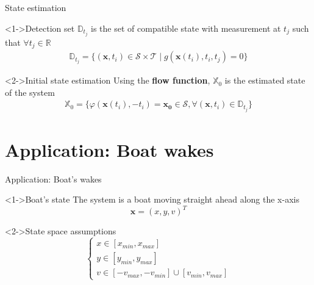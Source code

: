 \documentclass{beamer}
\begin{document}
            \begin{frame}{State estimation}
                \begin{block}<1->{Detection set}
                    $\mathbb{D}_{t_j}$ is the set of compatible state with measurement at $t_j$ such that $\forall t_j \in \mathbb{R}$
                    \begin{eqnarray}
                        \mathbb{D}_{t_j} = \{ (\mathbf{x}, t_i) \in \mathcal{S} \times \mathcal{T} \mid g(\mathbf{x}(t_i), t_i, t_j) = 0\}
                    \end{eqnarray}
                \end{block}

                \begin{block}<2->{Initial state estimation}
                    Using the \textbf{flow function}, $\mathbb{X}_0$ is the estimated state of the system
                    \begin{eqnarray}
                        \mathbb{X}_0 = \{ \varphi(\mathbf{x}(t_i), -t_i) = \mathbf{x_0} \in \mathcal{S}, \forall (\mathbf{x}, t_i) \in \mathbb{D}_{t_j} \}
                    \end{eqnarray}
                \end{block}
            \end{frame}
    
    \section{Application: Boat wakes}

            \begin{frame}{Application: Boat's wakes}
                \begin{block}<1->{Boat's state}
                    The system is a boat moving straight ahead along the x-axis
                    $$\mathbf{x} = (x, y, v)^T$$ 
                \end{block}
                \begin{block}<2->{State space assumptions}
                    \begin{equation}
                    \begin{cases}x \in [x_{min}, x_{max}] \\ y \in [y_{min}, y_{max}] \\ v \in [-v_{max}, -v_{min}] \cup [v_{min}, v_{max}] \end{cases}
                    \end{equation}
                \end{block}
            \end{frame}
\end{document}
